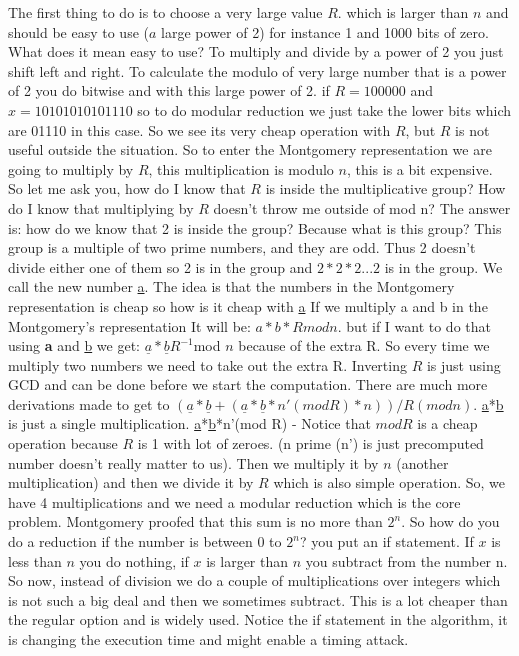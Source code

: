 The first thing to do is to choose a very large value $R$. which is larger than $n$ and should be easy to use ($a$ large power of 2) for instance 1 and 1000 bits of zero. What does it mean easy to use? To multiply and divide by a power of 2 you just shift left and right. To calculate the modulo of very large number that is a power of 2 you do bitwise and with this large power of 2. if $R=100000$ and $x = 10101010101110$ so to do  modular reduction we just take the lower bits which are 01110 in this case. So we see its very cheap operation with $R$, but $R$ is not useful outside the situation. So to enter the Montgomery representation we are going to multiply by $R$, this multiplication is modulo $n$, this is a bit expensive. So let me ask you, how do I know that $R$ is inside the multiplicative group? How do I know that multiplying by $R$ doesn't throw me outside of mod n? The answer is: how do we know that 2 is inside the group? Because what is this group? This group is a multiple of two prime numbers, and they are odd. Thus 2 doesn't divide either one of them so 2 is in the group and \(2*2*2...2\) is in the group. We call the new number \underline{a}. The idea is that the numbers in the Montgomery representation is cheap so how is it cheap with \underline{a} If we multiply a and b in the Montgomery's representation It will be: \(a*b*R mod n\). but if I want to do that using \textbf{a} and \underline{b} we  get: \(\underline{a}*\underline{b}R^{-1}\)mod $n$ because of the extra R. So every time we multiply two numbers we need to take out the extra R. Inverting $R$ is just using GCD and can be done before we start the computation. There are much more derivations made to get to  \((\underline{a}*\underline{b} + (\underline{a}*\underline{b}*n'(mod R)*n))/R(modn) \). \underline{a}*\underline{b} is just a single multiplication.  \underline{a}*\underline{b}*n'(mod R) - Notice that \(modR\) is a cheap operation because $R$ is 1 with lot of zeroes. (n prime (n') is just precomputed number doesn't really matter to us). Then we multiply it by $n$ (another multiplication) and then we divide it by $R$ which is also simple operation. So, we have 4 multiplications and we need a modular reduction which is the core problem. Montgomery proofed that this sum is no more than \(2^n\). So how do you do a reduction if the number is between 0 to \(2^n\)? you put an if statement. If $x$ is less than $n$ you do nothing, if $x$ is larger than $n$ you subtract from the number n. So now, instead of division we do a couple of multiplications over integers which is not such a big deal and then we sometimes subtract. This is a lot cheaper than the regular option and is widely used. Notice the if statement in the algorithm, it is changing the execution time and might enable a timing attack.


